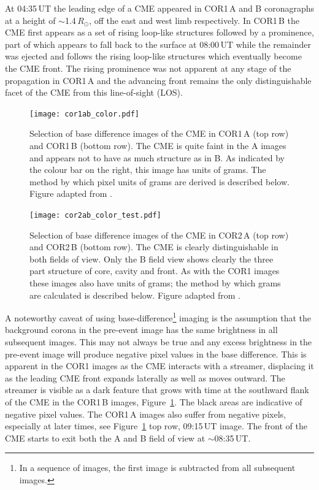 At 04:35\,UT the leading edge of a CME appeared in COR1\,A and B coronagraphs at a height of $\sim$1.4\,$R_{\odot}$, off the east and west limb respectively. In COR1\,B the CME first appears as a set of rising loop-like structures followed by a prominence, part of which appears to fall back to the surface at 08:00\,UT while the remainder was ejected and follows the rising loop-like structures which eventually become the CME front. The rising prominence was not apparent at any stage of the propagation in COR1\,A and the advancing front remains the only distinguishable facet 
of the CME from this line-of-sight (LOS).
\begin{figure}
    \centering
	\texttt{[image: cor1ab\_color.pdf]}
	\caption [2008-December-12 CME observed by COR1] {Selection of base difference images of the CME in COR1\,A  
	(top row) and COR1\,B (bottom row). The CME is quite faint in the A images and appears not to have as much structure
	as in B. As indicated by the colour bar on the right, this image has units of grams. The method by which pixel units of grams are derived is described below. Figure adapted from \citep{carley2012}.}
\label{fig:STEREO_COR1A&B}
\end{figure}

\begin{figure}
    \centering
    \texttt{[image: cor2ab\_color\_test.pdf]}
	\caption [2008-December-12 CMe observed by COR2]{Selection of base difference images of the CME in COR2\,A (top 	row) and COR2\,B (bottom row). The CME is 
	clearly distinguishable in both fields of view. Only the B field view shows clearly the three part structure of core, cavity and front. As with the COR1 images these images also have units of grams; the method by which grams are calculated is described below. Figure adapted from \citep{carley2012}.}
\label{fig:STEREO_COR2A&B}
\end{figure}    

A noteworthy caveat of using base-difference\footnote{In a sequence of images, the first image is subtracted from all subsequent images.} imaging is the assumption that the background corona in the pre-event image has the same brightness in all subsequent images. This may not always be true and any excess brightness in the pre-event image will produce negative pixel values in the base difference. This is apparent in the COR1 images as the CME interacts with a streamer, displacing it as the leading CME front expands laterally as well as moves outward. The streamer is visible as a dark feature that grows with time at the southward flank of the CME in the COR1\,B images, Figure~\ref{fig:STEREO_COR1A&B}. The black areas are indicative of negative pixel values. The COR1\,A images also suffer from negative pixels, especially at later times, see Figure~\ref{fig:STEREO_COR1A&B} top row, 09:15\,UT image. 
The front of the CME starts to exit both the A and B field of view at $\sim$08:35\,UT.

